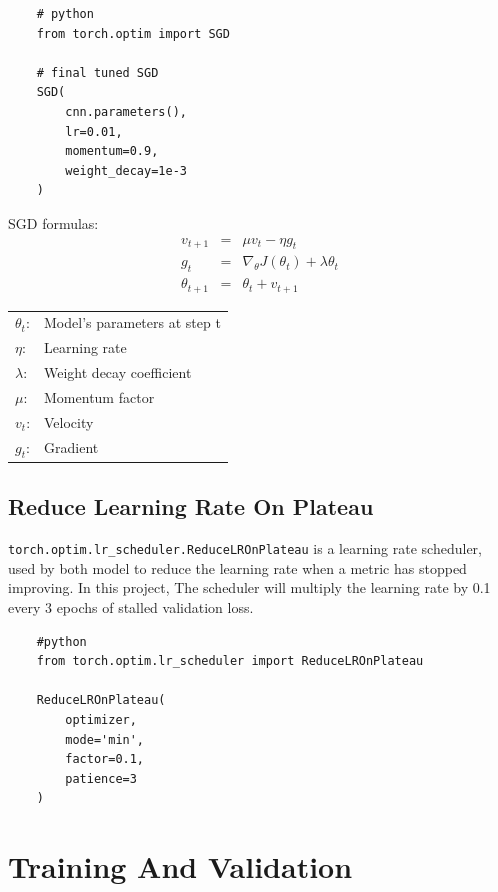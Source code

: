 \documentclass{report}
\begin{document}
\begin{verbatim}
    # python
    from torch.optim import SGD

    # final tuned SGD
    SGD(
        cnn.parameters(),
        lr=0.01,
        momentum=0.9,
        weight_decay=1e-3
    )
\end{verbatim}

SGD formulas:
\[
\begin{array}{rcl}
    v_{t+1}      & = & \mu v_t - \eta g_t                               \\ [0.2cm]
    g_t          & = & \nabla_{\theta} J(\theta_t) + \lambda \theta_t   \\ [0.2cm]
    \theta_{t+1} & = & \theta_t + v_{t+1}  
\end{array}
\]

\begin{center}
    \begin{tabular}{ll}
        $\theta_t$: & Model's parameters at step t      \\
        $\eta$:     & Learning rate                     \\
        $\lambda$:  & Weight decay coefficient          \\
        $\mu$:      & Momentum factor                   \\
        $v_t$:      & Velocity                          \\
        $g_t$:      & Gradient 
    \end{tabular}   
\end{center}

\subsection{Reduce Learning Rate On Plateau}
\texttt{torch.optim.lr\_scheduler.ReduceLROnPlateau} is a learning rate scheduler, used by both model to reduce 
the learning rate when a metric has stopped improving. In this project, The scheduler will multiply the learning
rate by 0.1 every 3 epochs of stalled validation loss.

\begin{verbatim}
    #python
    from torch.optim.lr_scheduler import ReduceLROnPlateau

    ReduceLROnPlateau(
        optimizer,
        mode='min', 
        factor=0.1, 
        patience=3
    )
\end{verbatim}

\section{Training And Validation}
\end{document}
